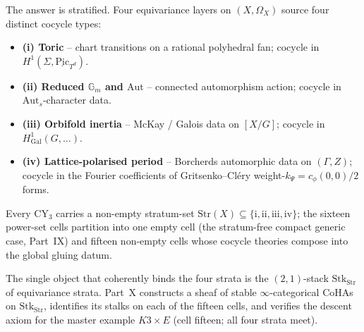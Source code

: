 \documentclass[11pt]{amsart}
\theoremstyle{definition}
\providecommand{\Aut}{\mathrm{Aut}}
\providecommand{\Pic}{\mathrm{Pic}}
\providecommand{\Str}{\mathrm{Str}}
\providecommand{\Gm}{\mathbb{G}_m}
\begin{document}
The answer is stratified. Four equivariance layers on $(X, \Omega_X)$ source
four distinct cocycle types:
\begin{itemize}[leftmargin=1.5em, itemsep=2pt]
\item \textbf{(i) Toric} -- chart transitions on a rational polyhedral fan;
cocycle in $H^1(\Sigma, \underline{\Pic}_{T^d})$.
\item \textbf{(ii) Reduced $\Gm$ and $\Aut$} -- connected automorphism action;
cocycle in $\Aut_s$-character data.
\item \textbf{(iii) Orbifold inertia} -- McKay / Galois data on $[X/G]$;
cocycle in $H^1_{\mathrm{Gal}}(G, \ldots)$.
\item \textbf{(iv) Lattice-polarised period} -- Borcherds automorphic data on
$(\Gamma, Z)$; cocycle in the Fourier coefficients of Gritsenko--Cl\'ery
weight-$k_\Psi = c_\phi(0,0)/2$ forms.
\end{itemize}
Every CY$_3$ carries a non-empty stratum-set $\Str(X) \subseteq \{\mathrm{i},
\mathrm{ii}, \mathrm{iii}, \mathrm{iv}\}$; the sixteen power-set cells partition
into one empty cell (the stratum-free compact generic case, Part~IX) and fifteen
non-empty cells whose cocycle theories compose into the global gluing datum.

The single object that coherently binds the four strata is the $(2,1)$-stack
$\mathrm{Stk}_{\Str}$ of equivariance strata. Part~X constructs a sheaf of
stable $\infty$-categorical CoHAs on $\mathrm{Stk}_{\Str}$, identifies its
stalks on each of the fifteen cells, and verifies the descent axiom for the
master example $K3 \times E$ (cell fifteen; all four strata meet).

















\end{document}
